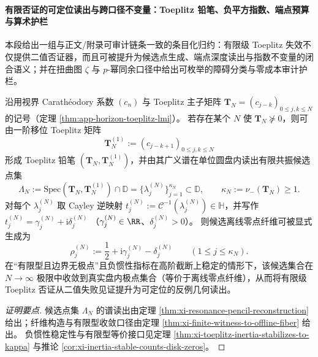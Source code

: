 \paragraph{有限否证的可定位读出与跨口径不变量：Toeplitz 铅笔、负平方指数、端点预算与算术护栏}
本段给出一组与正文/附录可审计链条一致的条目化归约：有限级 Toeplitz 失效不仅提供二值否证器，而且可被提升为候选点生成、端点深度读出与指数不变量的闭合语义；并在扭曲图 \(\zeta\) 与 \(p\)-幂同余口径中给出可枚举的障碍分类与零成本审计护栏。

\begin{conclusion}\label{con:xi-finite-falsifier-offline-fiber-readout}
沿用视界 Carath\'eodory 系数 \((c_n)\) 与 Toeplitz 主子矩阵 \(\mathbf{T}_N=(c_{j-k})_{0\le j,k\le N}\) 的记号（定理 \ref{thm:app-horizon-toeplitz-lmi}）。
若存在某个 \(N\) 使 \(\mathbf{T}_N\nsucceq 0\)，则可由一阶移位 Toeplitz 矩阵
\[
\mathbf{T}_N^{(1)}:=(c_{j-k+1})_{0\le j,k\le N}
\]
形成 Toeplitz 铅笔 \((\mathbf{T}_N,\mathbf{T}_N^{(1)})\)，并由其广义谱在单位圆盘内读出有限共振候选点集
\[
\Lambda_N:=\mathrm{Spec}(\mathbf{T}_N,\mathbf{T}_N^{(1)})\cap\mathbb{D}
=\{\lambda^{(N)}_j\}_{j=1}^{\kappa_N}\subset\mathbb{D},
\qquad \kappa_N:=\nu_-(\mathbf{T}_N)\ge 1.
\]
对每个 \(\lambda^{(N)}_j\) 取 Cayley 逆映射 \(t^{(N)}_j:=\mathcal{C}^{-1}(\lambda^{(N)}_j)\in\mathbb{H}\)，并写作
\(
t^{(N)}_j=\gamma^{(N)}_j+\mathrm{i}\delta^{(N)}_j
\)
（\(\gamma^{(N)}_j\in\RR\)、\(\delta^{(N)}_j>0\)）。
则候选离线零点纤维可被显式生成为
\[
\boxed{\;
\rho^{(N)}_j:=\frac12+\mathrm{i}\gamma^{(N)}_j-\delta^{(N)}_j\qquad(1\le j\le \kappa_N).\;}
\]
在“有限型且边界无极点”且负惯性指标在高阶截断上稳定的情形下，该候选集合在 \(N\to\infty\) 极限中收敛到真实盘内极点集合（等价于离线零点纤维），从而将有限级 Toeplitz 否证从二值失败见证提升为可定位的反例几何读出。
\end{conclusion}
\begin{proof}[证明要点]
候选点集 \(\Lambda_N\) 的谱读出由定理 \ref{thm:xi-resonance-pencil-reconstruction} 给出；纤维构造与有限型收敛口径由定理 \ref{thm:xi-finite-witness-to-offline-fiber} 给出。
负惯性稳定性与有限型等价接口见定理 \ref{thm:xi-toeplitz-inertia-stabilizes-to-kappa} 与推论 \ref{cor:xi-inertia-stable-counts-disk-zeros}。
\end{proof}

